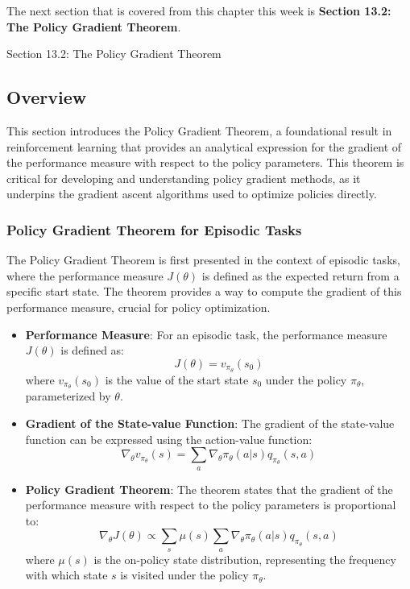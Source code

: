 The next section that is covered from this chapter this week is \textbf{Section 13.2: The Policy Gradient Theorem}.

\begin{notes}{Section 13.2: The Policy Gradient Theorem}
    \subsection*{Overview}

    This section introduces the Policy Gradient Theorem, a foundational result in reinforcement learning that provides an analytical expression for the gradient of the performance measure with respect to 
    the policy parameters. This theorem is critical for developing and understanding policy gradient methods, as it underpins the gradient ascent algorithms used to optimize policies directly.
    
    \subsubsection*{Policy Gradient Theorem for Episodic Tasks}
    
    The Policy Gradient Theorem is first presented in the context of episodic tasks, where the performance measure $J(\theta)$ is defined as the expected return from a specific start state. The theorem 
    provides a way to compute the gradient of this performance measure, crucial for policy optimization.
    
    \begin{highlight}
    
        \begin{itemize}
            \item \textbf{Performance Measure}: For an episodic task, the performance measure $J(\theta)$ is defined as:
            \[
            J(\theta) = v_{\pi_\theta}(s_0)
            \]
            where $v_{\pi_\theta}(s_0)$ is the value of the start state $s_0$ under the policy $\pi_\theta$, parameterized by $\theta$.
            \item \textbf{Gradient of the State-value Function}: The gradient of the state-value function can be expressed using the action-value function:
            \[
            \nabla_\theta v_{\pi_\theta}(s) = \sum_a \nabla_\theta \pi_\theta(a|s) q_{\pi_\theta}(s, a)
            \]
            \item \textbf{Policy Gradient Theorem}: The theorem states that the gradient of the performance measure with respect to the policy parameters is proportional to:
            \[
            \nabla_\theta J(\theta) \propto \sum_s \mu(s) \sum_a \nabla_\theta \pi_\theta(a|s) q_{\pi_\theta}(s, a)
            \]
            where $\mu(s)$ is the on-policy state distribution, representing the frequency with which state $s$ is visited under the policy $\pi_\theta$.
        \end{itemize}
    

\end{highlight}
\end{notes}
